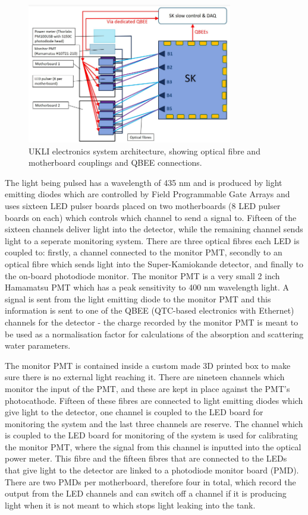 \begin{figure}
    \centering
    \includegraphics[width=0.8\textwidth]{Figures/ukli_system_architecture.png}
    \caption{UKLI electronics system architecture, showing optical fibre and motherboard couplings and QBEE connections.}
    \label{fig:ukli_system_architecture}
\end{figure}

The light being pulsed has a wavelength of 435 nm and is produced by light emitting diodes which are controlled by Field Programmable Gate Arrays and uses sixteen LED pulser boards placed on two motherboards (8 LED pulser boards on each) which controls which channel to send a signal to. Fifteen of the sixteen channels deliver light into the detector, while the remaining channel sends light to a seperate monitoring system. There are three optical fibres each LED is coupled to: firstly, a channel connected to the monitor PMT, secondly to an optical fibre which sends light into the Super-Kamiokande detector, and finally to the on-board photodiode monitor. The monitor PMT is a very small 2 inch Hamamatsu PMT which has a peak sensitivity to 400 nm wavelength light. A signal is sent from the light emitting diode to the monitor PMT and this information is sent to one of the QBEE (QTC-based electronics with Ethernet) channels for the detector - the charge recorded by the monitor PMT is meant to be used as a normalisation factor for calculations of the absorption and scattering water parameters. 
\newline

The monitor PMT is contained inside a custom made 3D printed box to make sure there is no external light reaching it. There are nineteen channels which monitor the input of the PMT, and these are kept in place against the PMT's photocathode. Fifteen of these fibres are connected to light emitting diodes which give light to the detector, one channel is coupled to the LED board for monitoring the system and the last three channels are reserve. The channel which is coupled to the LED board for monitoring of the system is used for calibrating the monitor PMT, where the signal from this channel is inputted into the optical power meter. This fibre and the fifteen fibres that are connected to the LEDs that give light to the detector are linked to a photodiode monitor board (PMD). There are two PMDs per motherboard, therefore four in total, which record the output from the LED channels and can switch off a channel if it is producing light when it is not meant to which stops light leaking into the tank. 

